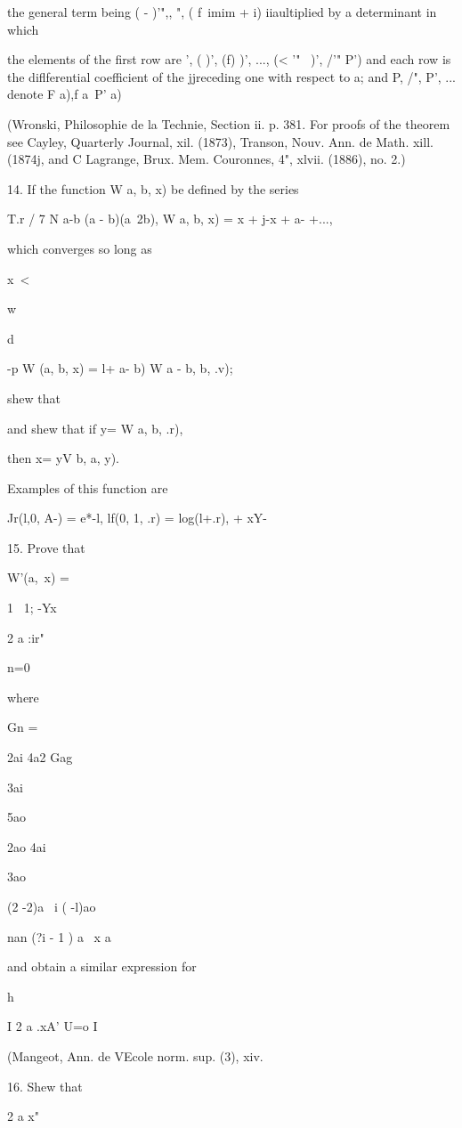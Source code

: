 {{the general term being ( - )'",, ", ( f\ imim + i) iiaultiplied by a
determinant in which

the elements of the first row are ', ( )', (f) )', ..., (< '"~ )', /'"
P') and each row is the diflferential coefficient of the jjreceding
one with respect to a; and P, /", P', ... denote F a),f a\ P' a)

(Wronski, Philosophie de la Technie, Section ii. p. 381. For proofs of
the theorem see Cayley, Quarterly Journal, xil. (1873), Transon, Nouv.
Ann. de Math. xill. (1874j, and C Lagrange, Brux. Mem. Couronnes, 4",
xlvii. (1886), no. 2.)

14. If the function W a, b, x) be defined by the series

T.r / 7 N a-b (a - b)(a~2b), W a, b, x) = x + j-x + a- +...,

which converges so long as

x\ <

w

d

-p W (a, b, x) = l+ a- b) W a - b, b, .v);

shew that

and shew that if y= W a, b, .r),

then x= yV b, a, y).

Examples of this function are

Jr(l,0, A-) = e*-l, lf(0, 1, .r) = log(l+.r), + xY-\

15. Prove that

W'(a, \,x) =

1 \ 1; -Yx


2 a :ir"

n=0

where

Gn =

2ai 4a2 Gag

3ai

5ao

2ao 4ai

3ao

(2 -2)a \ i ( -l)ao

nan (?i - 1 ) a \ x a

and obtain a similar expression for

h

I 2 a .xA' U=o I

(Mangeot, Ann. de VEcole norm. sup. (3), xiv.

16. Shew that

2 a x"

}}
